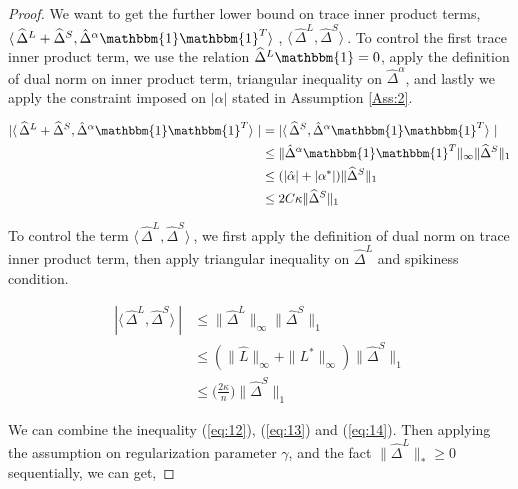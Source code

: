 \documentclass[AMS,STIX1COL]{WileyNJD-v2}
\begin{document}
\begin{proof}
We want to get the further lower bound on trace inner product terms, 
$ \langle\, \widehat\Delta^{L} + \widehat\Delta^{S} ,\hat{\Delta}^{\alpha}\mathbbm{1}\mathbbm{1}^T \rangle\ $, $ \langle\, \widehat\Delta^{L}, \widehat\Delta^{S} \rangle\ $. To control the first trace inner product term, we use the relation $\widehat{\Delta}^{L}\mathbbm{1}=0$, apply the definition of dual norm on inner product term, triangular inequality on $\hat{\Delta}^\alpha$, and lastly we apply the constraint imposed on $|\alpha|$ stated in Assumption \ref{Ass:2}.

\begin{align}
    | \langle\, \widehat\Delta^{L} + \widehat\Delta^{S} ,\hat{\Delta}^{\alpha}\mathbbm{1}\mathbbm{1}^T\rangle\ | \nonumber
    &= | \langle\,\widehat\Delta^{S},\hat{\Delta}^{\alpha}\mathbbm{1}\mathbbm{1}^T\rangle\ | \\ \nonumber
    &\leq \|\hat{\Delta}^{\alpha}\mathbbm{1}\mathbbm{1}^T \|_{\infty} \|\widehat{\Delta}^{S}\|_1 \\ \nonumber
    &\leq (|\hat{\alpha}|+|\alpha^{*}|)\|\widehat{\Delta}^{S}\|_1\\ 
    &\leq 2C\kappa\|\widehat{\Delta}^{S}\|_1  \label{eq:13}
\end{align}

To control the term $ \langle\, \widehat\Delta^{L}, \widehat\Delta^{S} \rangle\ $, we first apply the definition of dual norm on trace inner product term, then apply triangular inequality on $\widehat{\Delta}^{L}$ and spikiness condition. 

\begin{align}
    | \langle\, \widehat\Delta^{L}, \widehat\Delta^{S} \rangle\ | \nonumber
    &\leq \|\widehat{\Delta}^{L}\|_{\infty} \|\widehat{\Delta}^{S}\|_1\\ \nonumber
    &\leq (\|\widehat{L}\|_{\infty} + \|L^{*}\|_{\infty})
    \|\widehat{\Delta}^{S} \|_{1}\\
    &\leq \big(\frac{2\kappa}{n}\big)\|\widehat{\Delta}^{S} \|_{1} \label{eq:14}
\end{align}

We can combine the inequality (\ref{eq:12}), (\ref{eq:13}) and (\ref{eq:14}). Then applying the assumption on regularization parameter $\gamma$, and the fact $\|\widehat{\Delta}^{L}\|_{\ast}\geq0$ sequentially, we can get,  


\end{proof}
\end{document}
